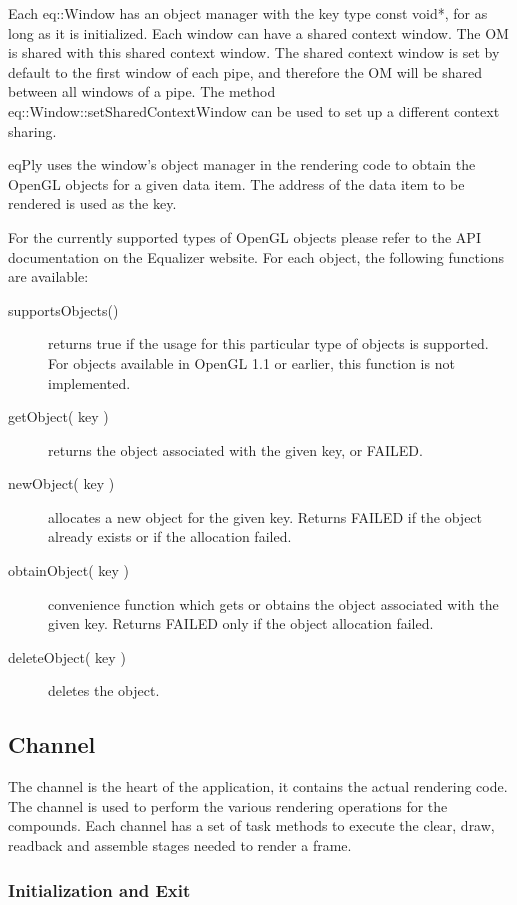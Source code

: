 \documentclass[10pt,a4]{scrartcl}
\begin{document}
Each \textsf{eq::Window} has an object manager with the key type
\textsf{const void*}, for as long as it is initialized. Each window can
have a shared context window. The OM is shared with this shared context
window. The shared context window is set by default to the first window
of each pipe, and therefore the OM will be shared between all windows of
a pipe. The method \textsf{eq::Window::setSharedContextWindow} can be
used to set up a different context sharing.

\textsf{eqPly} uses the window's object manager in the rendering code to
obtain the OpenGL objects for a given data item. The address of the data
item to be rendered is used as the key.

For the currently supported types of OpenGL objects please refer to the
API documentation on the Equalizer website. For each object, the
following functions are available:

\begin{description}
\item[supportsObjects()] returns true if the usage for this particular
  type of objects is supported. For objects available in OpenGL 1.1 or
  earlier, this function is not implemented.
\item[getObject( key )] returns the object associated with the given
  key, or FAILED.
\item[newObject( key )] allocates a new object for the given
  key. Returns FAILED if the object already exists or if the allocation
  failed.
\item[obtainObject( key )] convenience function which gets or obtains
  the object associated with the given key. Returns FAILED only if the
  object allocation failed.
\item[deleteObject( key )] deletes the object.
\end{description}


\subsection{Channel}

The channel is the heart of the application, it contains the actual
rendering code. The channel is used to perform the various rendering
operations for the compounds. Each channel has a set of task methods to
execute the clear, draw, readback and assemble stages needed to render a
frame.

\subsubsection{Initialization and Exit}
\end{document}
